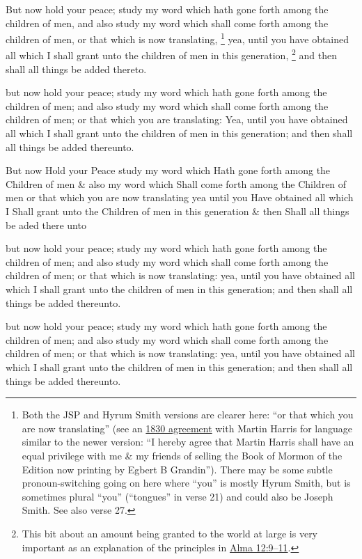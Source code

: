 		But now hold your peace; study my word which hath gone forth among the children of men, and also study my word which shall come forth among the children of men, or that which is now translating,%
			\footnote{%
				Both the JSP and Hyrum Smith versions are clearer here: ``or that which you are now translating'' (see an \href{https://www.josephsmithpapers.org/paper-summary/agreement-with-martin-harris-16-january-1830/1}{1830 agreement} with Martin Harris for language similar to the newer version: ``I hereby agree that Martin Harris shall have an equal privilege with me \& my friends of selling the Book of Mormon of the Edition now printing by Egbert B Grandin''). There may be some subtle pronoun-switching going on here where ``you'' is mostly Hyrum Smith, but is sometimes plural ``you'' (``tongues'' in verse 21) and could also be Joseph Smith. See also verse 27.
				}
		yea, until you have obtained all which I shall grant unto the children of men in this generation,%
			\footnote{%
				This bit about an amount being granted to the world at large is very important as an explanation of the principles in \hyperref[ALMA-12-9]{Alma 12:9--11}.
				}
		and then shall all things be added thereto.

		\begin{framed}
		\scriptsize
			\begin{compactdesc}
				\item[JSP] but now hold your peace; study my word which hath gone forth among the children of men; and also study my word which shall come forth among the children of men; or that which you are translating: Yea, until you have obtained all which I shall grant unto the children of men in this generation; and then shall all things be added thereunto.
				\item[HS] But now Hold your Peace study my word which Hath gone forth among the Children of men \& also my word which Shall come forth among the Children of men or that which you are now translating yea until you Have obtained all which I Shall grant unto the Children of men in this generation \& then Shall all things be aded there unto 
				\item[DC 1835] but now hold your peace; study my word which hath gone forth among the children of men; and also study my word which shall come forth among the children of men; or that which is now translating: yea, until you have obtained all which I shall grant unto the children of men in this generation; and then shall all things be added thereunto.
				\item[DC 1844] but now hold your peace; study my word which hath gone forth among the children of men; and also study my word which shall come forth among the children of men; or that which is now translating: yea, until you have obtained all which I shall grant unto the children of men in this generation; and then shall all things be added thereunto.
			\end{compactdesc}
		\end{framed}

